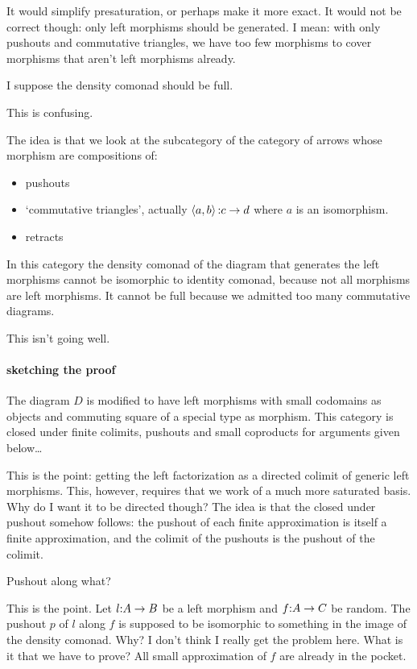 \documentclass[csh.tex]{subfiles}
\begin{document}
It would simplify presaturation, or perhaps make it more exact. It would not be correct though: only left morphisms should be generated. I mean: with only pushouts and commutative triangles, we have too few morphisms to cover morphisms that aren't left morphisms already.

I suppose the density comonad should be full.

This is confusing.

The idea is that we look at the subcategory of the category of arrows whose morphism are compositions of:
\begin{itemize}
\item pushouts
\item `commutative triangles', actually $\left\langle a,b \right\rangle\mathord : c\to d$ where $a$ is an isomorphism.
\item retracts
\end{itemize}

In this category the density comonad of the diagram that generates the left morphisms cannot be isomorphic to identity comonad, because not all morphisms are left morphisms. It cannot be full because we admitted too many commutative diagrams.

This isn't going well.

\paragraph{sketching the proof}
The diagram $D$ is modified to have left morphisms with small codomains as objects and commuting square of a special type as morphism. This category is closed under finite colimits, pushouts and small coproducts for arguments given below\dots

This is the point: getting the left factorization as a directed colimit of generic left morphisms. This, however, requires that we work of a much more saturated basis. Why do I want it to be directed though?
The idea is that the closed under pushout somehow follows: the pushout of each finite approximation is itself a finite approximation, and the colimit of the pushouts is the pushout of the colimit.

Pushout along what?

This is the point. Let $l\mathord : A\to B$ be a left morphism and $f\mathord : A\to C$ be random. The pushout $p$ of $l$ along $f$ is supposed to be isomorphic to something in the image of the density comonad. Why? I don't think I really get the problem here. What is it that we have to prove?
All small approximation of $f$ are already in the pocket. 
\end{document}
